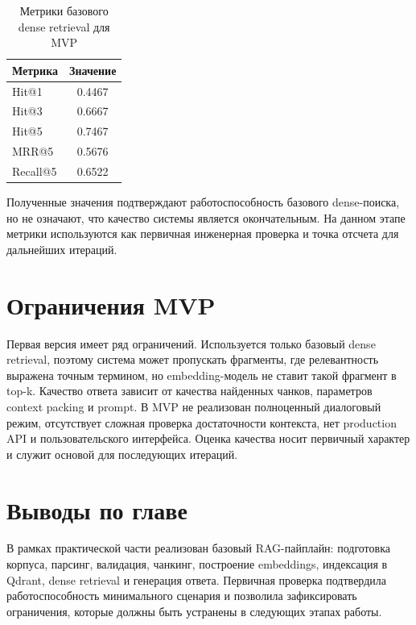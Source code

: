 \begin{table}[h]
\caption{Метрики базового dense retrieval для MVP}
\label{tbl:dense-metrics}
\centering
\begin{tabular}{|l|c|}
\hline
Метрика & Значение \\
\hline
Hit@1 & 0.4467 \\
Hit@3 & 0.6667 \\
Hit@5 & 0.7467 \\
MRR@5 & 0.5676 \\
Recall@5 & 0.6522 \\
\hline
\end{tabular}
\end{table}

Полученные значения подтверждают работоспособность базового dense-поиска, но не означают, что качество системы является окончательным. На данном этапе метрики используются как первичная инженерная проверка и точка отсчета для дальнейших итераций.

\section{Ограничения MVP}

Первая версия имеет ряд ограничений. Используется только базовый dense retrieval, поэтому система может пропускать фрагменты, где релевантность выражена точным термином, но embedding-модель не ставит такой фрагмент в top-k. Качество ответа зависит от качества найденных чанков, параметров context packing и prompt. В MVP не реализован полноценный диалоговый режим, отсутствует сложная проверка достаточности контекста, нет production API и пользовательского интерфейса. Оценка качества носит первичный характер и служит основой для последующих итераций.

\section{Выводы по главе}

В рамках практической части реализован базовый RAG-пайплайн: подготовка корпуса, парсинг, валидация, чанкинг, построение embeddings, индексация в Qdrant, dense retrieval и генерация ответа. Первичная проверка подтвердила работоспособность минимального сценария и позволила зафиксировать ограничения, которые должны быть устранены в следующих этапах работы.

